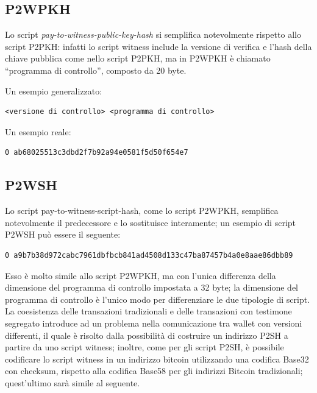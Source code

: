 \subsection{P2WPKH}

Lo script {\it pay-to-witness-public-key-hash \/} si semplifica notevolmente rispetto allo script P2PKH: infatti lo script witness include la versione di verifica e l’hash della chiave pubblica come nello script  P2PKH,  ma in P2WPKH è chiamato “programma di controllo”, composto da 20 byte.

Un esempio generalizzato:
\begin{lstlisting}[language=bitcoinscript, label={code:generalexamplep2wpkh}, caption={Esempio generale della struttura di uno script P2WPKH.}]
<versione di controllo> <programma di controllo>
\end{lstlisting}

Un esempio reale:
\begin{lstlisting}[language=bitcoinscript, label={code:xamplep2wpkh}, caption={Esempio reale di uno script P2WPKH.}]
0 ab68025513c3dbd2f7b92a94e0581f5d50f654e7
\end{lstlisting}

\subsection{P2WSH}

Lo script pay-to-witness-script-hash, come lo script P2WPKH, semplifica notevolmente il predecessore e lo sostituisce interamente; un esempio di script P2WSH può essere il seguente:
\begin{lstlisting}[language=bitcoinscript, label={code:examplep2wsh}, caption={Esempio di uno script P2WSH.}]
0 a9b7b38d972cabc7961dbfbcb841ad4508d133c47ba87457b4a0e8aae86dbb89
\end{lstlisting}
Esso è molto simile allo script P2WPKH, ma con l’unica differenza della dimensione del programma di controllo impostata a 32 byte; la dimensione del programma di controllo è l’unico modo per differenziare le due tipologie di script.
La coesistenza delle transazioni tradizionali e delle transazioni con testimone segregato introduce ad un problema nella comunicazione tra wallet con versioni differenti, il quale è risolto dalla possibilità di costruire un indirizzo P2SH a partire da uno script witness; inoltre, come per gli script P2SH, è possibile codificare lo script witness in un indirizzo bitcoin utilizzando una codifica Base32 con checksum, rispetto alla codifica Base58 per gli indirizzi Bitcoin tradizionali; quest’ultimo sarà simile al seguente.

